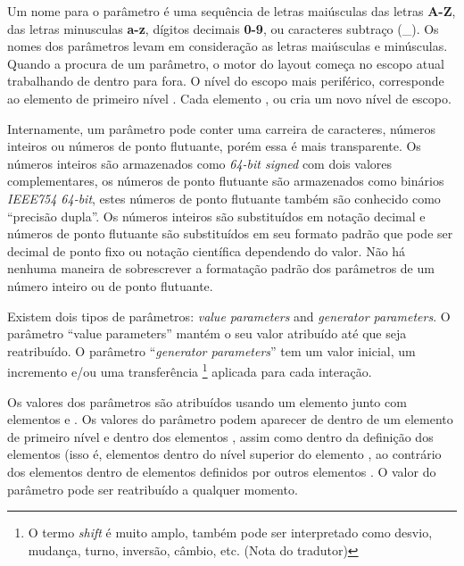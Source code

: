 \documentclass[letterpaper,10pt,brazil]{sphinxmanual}
\begin{document}
Um nome para o parâmetro é uma sequência de letras maiúsculas das letras
\textbf{A-Z}, das letras minusculas \textbf{a-z}, dígitos decimais \textbf{0-9}, ou
caracteres subtraço (\_).
Os nomes dos parâmetros levam em consideração as letras maiúsculas e
minúsculas. Quando a procura de um parâmetro, o motor do layout começa
no escopo atual trabalhando de dentro para fora. O nível do escopo mais periférico,
corresponde ao elemento de primeiro nível . Cada elemento
,  ou  cria um novo nível de escopo.

Internamente, um parâmetro pode conter uma carreira de caracteres,
números inteiros ou números de ponto flutuante, porém essa é mais
transparente.
Os números inteiros são armazenados como \emph{64-bit signed} com dois valores
complementares, os números de ponto flutuante são armazenados como
binários \emph{IEEE754 64-bit}, estes números de ponto flutuante também são
conhecido como ``precisão dupla''. Os números inteiros são substituídos em
notação decimal e números de ponto flutuante são substituídos em seu
formato padrão que pode ser decimal de ponto fixo ou notação científica
dependendo do valor. Não há nenhuma maneira de sobrescrever a formatação
padrão dos parâmetros de um número inteiro ou de ponto flutuante.

Existem dois tipos de parâmetros: \emph{value parameters} and \emph{generator
parameters}. O parâmetro ``value parameters'' mantém o seu valor atribuído
até que seja reatribuído.
O parâmetro ``\emph{generator parameters}'' tem um valor inicial, um incremento
e/ou uma transferência \footnote[4]{\sphinxAtStartFootnote%
O termo \emph{shift} é muito amplo, também pode ser
interpretado como desvio, mudança, turno, inversão, câmbio, etc.
(Nota do tradutor)
} aplicada para cada interação.

Os valores dos parâmetros são atribuídos usando um elemento 
junto com elementos  e . Os valores do parâmetro podem
aparecer de dentro de um elemento de primeiro nível  e
dentro dos elementos ,  assim como dentro da definição
dos elementos  (isso é, elementos  dentro do nível
superior do elemento , ao contrário dos elementos
 dentro de elementos  definidos por outros elementos
.
O valor do parâmetro pode ser reatribuído a qualquer momento.
\end{document}
